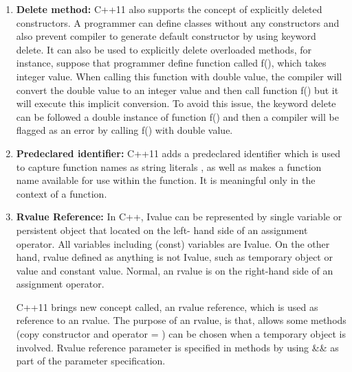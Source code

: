 \documentclass[11pt,]{report}
\begin{document}
\begin{enumerate}
\item \textbf{Delete method:} C++11 also supports the concept of explicitly deleted constructors. A programmer can define classes without any \linebreak constructors and also prevent compiler to generate default constructor by using keyword delete.  It can also be used to explicitly delete \linebreak overloaded methods, for instance, suppose that programmer define \linebreak function called f(), which takes integer value. When calling this \linebreak function with double value, the compiler will convert the double value to an integer value and then call function f() but it will execute this \linebreak implicit conversion. To avoid this issue, the keyword delete can be \linebreak followed a double instance of function f() and then a compiler will be flagged as an error by calling f() with double value\cite{Gregorie:professionalcpp}.
  
\item \textbf{Predeclared identifier:} C++11 adds a predeclared identifier which is used to capture function names as string literals , as well as makes a function name available for use within the function. It is meaningful only in the context of a function\cite{Gregorie:professionalcpp}.

\item \textbf{Rvalue Reference:} In C++, Ivalue can be represented by single variable or persistent object that located on the left- hand side of an   assignment operator. All variables including (const) variables are Ivalue. On the other hand, rvalue defined as anything is not Ivalue, such as temporary object or value and constant value. Normal, an rvalue is on the  right-hand side of an assignment operator. 

C++11 brings new concept called, an rvalue reference, which is used as reference to an rvalue. The purpose of an rvalue, is that, allows some methods (copy constructor and operator = ) can be chosen when \linebreak a temporary object is involved. Rvalue reference parameter is specified in methods by using \&\& as part of the parameter specification\cite{Gregorie:professionalcpp}. 
\end{enumerate}
 
  
 
\end{document}
